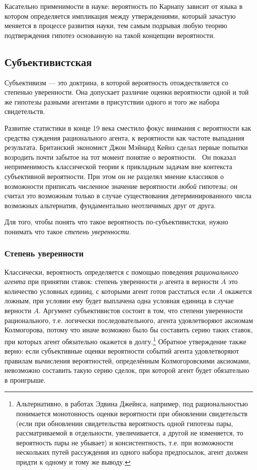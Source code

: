 \documentclass[14pt]{extarticle}
\begin{document}
Касательно применимости в науке: вероятность по Карнапу зависит от языка в котором определяется импликация между утверждениями, который зачастую меняется в процессе развития науки, тем самым подрывая любую теорию подтверждения гипотез основанную на такой концепции вероятности.

\subsection{Субъективистская}

Субъективизм --- это доктрина, в которой вероятность отождествляется со степенью уверенности. Она допускает различие оценки вероятности одной и той же гипотезы разными агентами в присутствии одного и того же набора свидетельств. 

Развитие статистики в конце 19 века сместило фокус внимания с вероятности как средства суждения рационального агента, к вероятности как частоте выпадания результата. Британский экономист Джон Мэйнард Кейнз сделал первые попытки возродить почти забытое на тот момент понятие о вероятности.~\cite{Keynes} Он показал неприменимость классической теории к прикладным задачам вне контекста субъективной вероятности. При этом он не разделял мнение классиков о возможности приписать численное значение вероятности \emph{любой} гипотезы; он считал это возможным только в случае существования детерминированного числа возможных альтернатив, фундаментально неотличимых друг от друга.~\cite[стр. 5]{Carnap}

Для того, чтобы понять что такое вероятность по-субъективистски, нужно понимать что такое \emph{степень уверенности}.

\subsubsection{Степень уверенности}

Классически, вероятность определяется с помощью поведения \emph{рационального агента} при принятии ставок: степень уверенности $p$ агента в верности $A$ это количество условных единиц, с которыми агент готов расстаться если $A$ окажется ложным, при условии ему будет выплачена одна условная единица в случае верности $A$. Аргумент субъективистов состоит в том, что степени уверенности рационального, т.е. логически последовательного, агента удовлетворяют аксиомам Колмогорова, потому что иначе возможно было бы составить серию таких ставок, при которых агент обязательно окажется в долгу.\footnote{
	Альтернативно, в работах Эдвина Джейнса, например, под рациональностью понимается монотонность оценки вероятности при обновлении свидетельств (если при обновлении свидетельства вероятность одной гипотезы пары, рассматриваемой в отдельности, увеличивается, а другой не изменяется, то вероятность пары не убывает) и консистентность, т.е. при возможности нескольких путей рассуждения из одного набора предпосылок, агент должен придти к одному и тому же выводу.
} 
Обратное утверждение также верно: если субъективные оценки вероятности событий агента удовлетворяют правилам вычисления вероятностей, определённым Колмогоровскими аксиомами, невозможно составить такую серию сделок, при которой агент будет обязательно в проигрыше.
\end{document}
